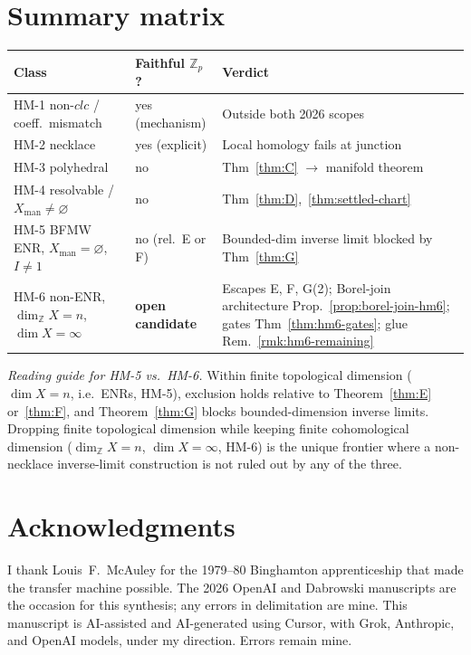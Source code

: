 \documentclass[11pt]{article}
\theoremstyle{definition}
\begin{document}
\section{Summary matrix}
\label{sec:matrix}

\begin{center}
\small
\begin{tabular}{@{}p{3.4cm}p{2.4cm}p{7.2cm}@{}}
\toprule
Class & Faithful $\mathbb{Z}_p$? & Verdict \\
\midrule
HM-1 non-$clc$ / coeff.\ mismatch & yes (mechanism) & Outside both 2026 scopes \\
HM-2 necklace & yes (explicit) & Local homology fails at junction \\
HM-3 polyhedral & no & Thm~\ref{thm:C} $\to$ manifold theorem \\
HM-4 resolvable / $X_{\mathrm{man}}\neq\varnothing$ & no & Thm~\ref{thm:D},~\ref{thm:settled-chart} \\
HM-5 BFMW ENR, $X_{\mathrm{man}}=\varnothing$, $I\neq 1$ & no (rel.\ E or F) & Bounded-dim inverse limit blocked by Thm~\ref{thm:G} \\
HM-6 non-ENR, $\dim_{\mathbb{Z}}X=n$, $\dim X=\infty$ & \textbf{open candidate} & Escapes E, F, G(2); Borel-join architecture Prop.~\ref{prop:borel-join-hm6}; gates Thm~\ref{thm:hm6-gates}; glue Rem.~\ref{rmk:hm6-remaining} \\
\bottomrule
\end{tabular}
\end{center}

\noindent\textit{Reading guide for HM-5 vs.\ HM-6.}
Within finite topological dimension ($\dim X=n$, i.e.\ ENRs, HM-5),
exclusion holds relative to Theorem~\ref{thm:E} or~\ref{thm:F}, and
Theorem~\ref{thm:G} blocks bounded-dimension inverse limits.  Dropping finite
topological dimension while keeping finite cohomological dimension
($\dim_{\mathbb{Z}}X=n$, $\dim X=\infty$, HM-6) is the unique frontier where a
non-necklace inverse-limit construction is not ruled out by any of the three.

\section*{Acknowledgments}
I thank Louis~F.\ McAuley for the 1979--80 Binghamton apprenticeship that
made the transfer machine possible.  The 2026 OpenAI and Dabrowski manuscripts
are the occasion for this synthesis; any errors in delimitation are mine.
This manuscript is AI-assisted and AI-generated using Cursor, with Grok,
Anthropic, and OpenAI models, under my direction.  Errors remain mine.
\end{document}
